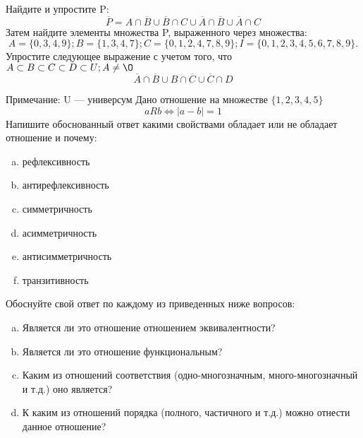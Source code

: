 \documentclass[10pt]{exam}
\begin{document}
\begin{questions}
\question
Найдите и упростите P:
\begin{equation*}
\overline{P} = A \cap \overline{B} \cup \overline{B} \cap C \cup \overline{A} \cap \overline{B} \cup \overline{A} \cap C
\end{equation*}
Затем найдите элементы множества P, выраженного через множества:
\begin{equation*}
A = \{0, 3, 4, 9\}; 
B = \{1, 3, 4, 7\};
C = \{0, 1, 2, 4, 7, 8, 9\};
I = \{0, 1, 2, 3, 4, 5, 6, 7, 8, 9\}.
\end{equation*}\question
Упростите следующее выражение с учетом того, что $A\subset B \subset C \subset D \subset U; A \neq \O$
\begin{equation*}
\overline{A} \cap \overline{B} \cup B \cap \overline{C} \cup \overline{C} \cap D
\end{equation*}

Примечание: U — универсум\question
Дано отношение на множестве $\{1, 2, 3, 4, 5\}$ 
\begin{equation*}
aRb \iff |a-b| = 1
\end{equation*}
Напишите обоснованный ответ какими свойствами обладает или не обладает отношение и почему:   
\begin{enumerate} [a)]\setcounter{enumi}{0}
\item рефлексивность
\item антирефлексивность
\item симметричность
\item асимметричность
\item антисимметричность
\item транзитивность
\end{enumerate}

Обоснуйте свой ответ по каждому из приведенных ниже вопросов:
\begin{enumerate} [a)]\setcounter{enumi}{0}
    \item Является ли это отношение отношением эквивалентности?
    \item Является ли это отношение функциональным?
    \item Каким из отношений соответствия (одно-многозначным, много-многозначный и т.д.) оно является?
    \item К каким из отношений порядка (полного, частичного и т.д.) можно отнести данное отношение?
\end{enumerate}


\end{questions}
\end{document}
